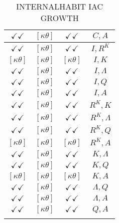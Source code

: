 \documentclass[a4paper,10pt]{article}
\begin{document}
\begin{longtable}{|c|c|c|c|}
\hline
$\checkmark\checkmark$ & $[\kappa \theta ]$ & $\checkmark\checkmark$ & ${C},{A}$ \\
\hline
$\checkmark\checkmark$ & $[\kappa \theta ]$ & $\checkmark\checkmark$ & ${I},{R^{K}}$ \\
\hline
$[\kappa \theta ]$ & $[\kappa \theta ]$ & $[\kappa \theta ]$ & ${I},{K}$ \\
\hline
$\checkmark\checkmark$ & $[\kappa \theta ]$ & $\checkmark\checkmark$ & ${I},{\Lambda}$ \\
\hline
$\checkmark\checkmark$ & $[\kappa \theta ]$ & $\checkmark\checkmark$ & ${I},{Q}$ \\
\hline
$\checkmark\checkmark$ & $[\kappa \theta ]$ & $\checkmark\checkmark$ & ${I},{A}$ \\
\hline
$\checkmark\checkmark$ & $[\kappa \theta ]$ & $\checkmark\checkmark$ & ${R^{K}},{K}$ \\
\hline
$\checkmark\checkmark$ & $[\kappa \theta ]$ & $\checkmark\checkmark$ & ${R^{K}},{\Lambda}$ \\
\hline
$\checkmark\checkmark$ & $[\kappa \theta ]$ & $\checkmark\checkmark$ & ${R^{K}},{Q}$ \\
\hline
$[\kappa \theta ]$ & $[\kappa \theta ]$ & $[\kappa \theta ]$ & ${R^{K}},{A}$ \\
\hline
$\checkmark\checkmark$ & $[\kappa \theta ]$ & $\checkmark\checkmark$ & ${K},{\Lambda}$ \\
\hline
$\checkmark\checkmark$ & $[\kappa \theta ]$ & $\checkmark\checkmark$ & ${K},{Q}$ \\
\hline
$[\kappa \theta ]$ & $[\kappa \theta ]$ & $[\kappa \theta ]$ & ${K},{A}$ \\
\hline
$\checkmark\checkmark$ & $[\kappa \theta ]$ & $\checkmark\checkmark$ & ${\Lambda},{Q}$ \\
\hline
$\checkmark\checkmark$ & $[\kappa \theta ]$ & $\checkmark\checkmark$ & ${\Lambda},{A}$ \\
\hline
$\checkmark\checkmark$ & $[\kappa \theta ]$ & $\checkmark\checkmark$ & ${Q},{A}$ \\
\hline
\caption{INTERNALHABIT IAC GROWTH}
\label{table:MyTableLabel}
\end{longtable}
\end{document}
